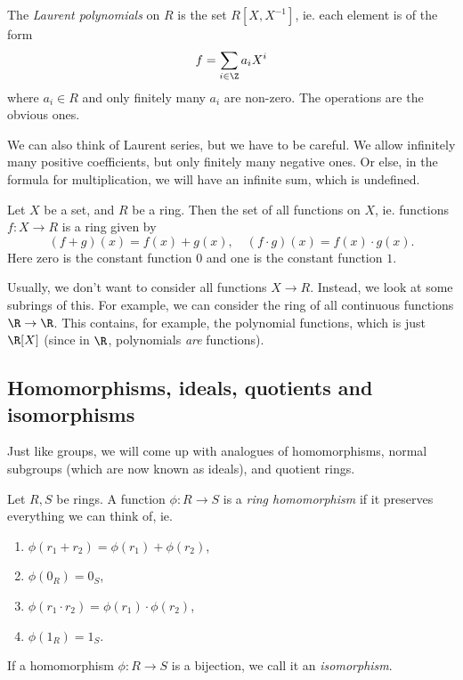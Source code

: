 \documentclass[a4paper]{article}
\begin{document}
\begin{defi}
  The \emph{Laurent polynomials} on $R$ is the set $R[X, X^{-1}]$, ie. each element is of the form
  \[
    f = \sum_{i \in \Z} a_i X^i
  \]
  where $a_i \in R$ and only finitely many $a_i$ are non-zero. The operations are the obvious ones.
\end{defi}
We can also think of Laurent series, but we have to be careful. We allow infinitely many positive coefficients, but only finitely many negative ones. Or else, in the formula for multiplication, we will have an infinite sum, which is undefined.

\begin{eg}
  Let $X$ be a set, and $R$ be a ring. Then the set of all functions on $X$, ie. functions $f: X \to R$ is a ring given by
  \[
    (f + g)(x) = f(x) + g(x),\quad (f\cdot g)(x) = f(x) \cdot g(x).
  \]
  Here zero is the constant function $0$ and one is the constant function $1$.

  Usually, we don't want to consider all functions $X \to R$. Instead, we look at some subrings of this. For example, we can consider the ring of all continuous functions $\R \to \R$. This contains, for example, the polynomial functions, which is just $\R[X]$ (since in $\R$, polynomials \emph{are} functions).
\end{eg}

\subsection{Homomorphisms, ideals, quotients and isomorphisms}
Just like groups, we will come up with analogues of homomorphisms, normal subgroups (which are now known as ideals), and quotient rings.

\begin{defi}
  Let $R, S$ be rings. A function $\phi: R \to S$ is a \emph{ring homomorphism} if it preserves everything we can think of, ie.
  \begin{enumerate}
    \item $\phi(r_1 + r_2) = \phi(r_1) + \phi(r_2)$,
    \item $\phi(0_R) = 0_S$,
    \item $\phi(r_1 \cdot r_2) = \phi(r_1) \cdot \phi(r_2)$,
    \item $\phi(1_R) = 1_S$.
  \end{enumerate}
\end{defi}

\begin{defi}
  If a homomorphism $\phi: R \to S$ is a bijection, we call it an \emph{isomorphism}.
\end{defi}
\end{document}
